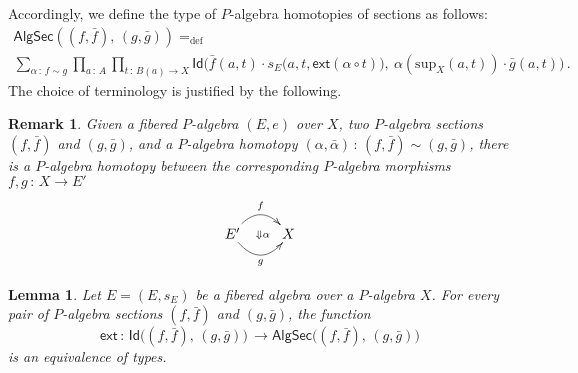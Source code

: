 \documentclass[10pt,a4paper,oneside,reqno]{amsart}
\theoremstyle{mythm}
\newtheorem{lemma}[theorem]{Lemma}
\theoremstyle{mydef}
\theoremstyle{myrmk}
\newtheorem*{remark*}{Remark}
\newcommand{\defeq}{=_{\mathrm{def}}}
\newcommand{\co}{\,{:}\,}
\newcommand{\ct}{\cdot}
\newcommand{\ext}{\mathsf{ext}}
\newcommand{\Id}{\mathsf{Id}}
\renewcommand{\sup}{\mathrm{sup}}
\newcommand{\AlgSecHot}{\mathsf{AlgSec}}
\begin{document}
Accordingly, we define the type of $P$-algebra homotopies of sections as follows:
\begin{multline*}
\AlgSecHot( (f, \bar{f}) ,\, (g, \bar{g}) )  \defeq \\ 
\sum_{\alpha \co f \sim g} \prod_{a \co A} \prod_{t \co B(a) \to X} 
\Id\big( \bar{f}(a,t)  \ct s_E \big(a,t, \ext (\alpha \circ t) \big),\ 
\alpha(\sup_X(a,t)) \ct \bar{g}(a,t) \big) \, .
\end{multline*}
The choice of terminology is justified by the following.

\begin{remark*} 
Given a fibered $P$-algebra $(E, e)$ over $X$, two $P$-algebra sections $(f, \bar{f})$ and $(g, \bar{g})$, and a 
$P$-algebra homotopy $(\alpha, \bar{\alpha}) \co (f, \bar{f}) \sim (g, \bar{g})$, there is a $P$-algebra homotopy between the corresponding $P$-algebra morphisms $f, g \co X \to E'$ 
\[
\xymatrix{ E' \ar@{}[r]|{\ \Downarrow \alpha}   \ar@/^1.2pc/[r]^{f}  \ar@/_1.2pc/[r]_{g} & X}
 \]
\end{remark*}




\begin{lemma}\label{lem:fibhomeqid} Let $E = (E, s_E)$ be a fibered algebra over a $P$-algebra $X$.
For every pair of $P$-algebra sections $(f, \bar{f})$ and $(g, \bar{g})$,  the function
\[
\ext \co \Id \big( (f, \bar{f}) ,\, (g, \bar{g}) \big) \, \to
\AlgSecHot\big( (f, \bar{f}) ,\, (g, \bar{g}) \big) 
\]
is an equivalence of types.
\end{lemma}
\end{document}
